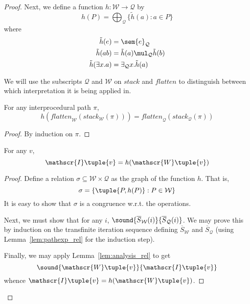 \begin{proof}
     Next, we define a function $h : \mathcal{W} \rightarrow \mathcal{Q}$ by
     \[ h(P) = \bigoplus_{\mathcal{Q}} \{ \tilde{h}(a) : a \in P \} \]
     where
     \begin{align*}
       \tilde{h}(e) &= \sem{e}_{\mathcal{Q}}\\
       \tilde{h}(ab) &= \tilde{h}(a) \mul_{\mathcal{Q}} \tilde{h}(b)\\
       \tilde{h}(\exists x.a) &= \exists_{\mathcal{Q}} x. \tilde{h}(a)
     \end{align*}

     We will use the subscripts $\mathcal{Q}$ and $\mathcal{W}$ on
     $\textit{stack}$ and $\textit{flatten}$ to distinguish between which
     interpretation it is being applied in.

     \begin{lemma} \label{lem:flatten}
       For any interprocedural path $\pi$,
       \[h(\textit{flatten}_{\mathcal{W}}(\textit{stack}_{\mathcal{W}}(\pi))) = 
       \textit{flatten}_{\mathcal{Q}}(\textit{stack}_{\mathcal{Q}}(\pi)) \]
     \end{lemma}
     \begin{proof}
       By induction on $\pi$.
     \end{proof}

     \begin{lemma} \label{lem:factor}
       For any $v$,
       \[ \mathscr{I}\tuple{v} = h(\mathscr{W}\tuple{v}) \]
     \end{lemma}
     \begin{proof}
       Define a relation $\sigma \subseteq \mathcal{W} \times \mathcal{Q}$ as
       the graph of the function $h$.  That is,
       \[ \sigma = \{ \tuple{P,h(P)} : P \in \mathcal{W} \} \]
       It is easy to show that $\sigma$ is a congruence w.r.t. the \QPKA{}
       operations.

       Next, we must show that for any $i$,
       $\sound{\overline{S}_{\mathcal{W}}(i)}{\overline{S}_{\mathcal{Q}}(i)}$.
       We may prove this by induction on the transfinite iteration
       sequence defining $\overline{S}_{\mathcal{W}}$ and
       $\overline{S}_{\mathcal{Q}}$ (using Lemma~\ref{lem:pathexp_rel} for the
       induction step).

       Finally, we may apply Lemma~\ref{lem:analysis_rel} to get
       \[ \sound{\mathscr{W}\tuple{v}}{\mathscr{I}\tuple{v}} \]
       whence $\mathscr{I}\tuple{v} = h(\mathscr{W}\tuple{v})$.
     \end{proof}


\end{proof}
